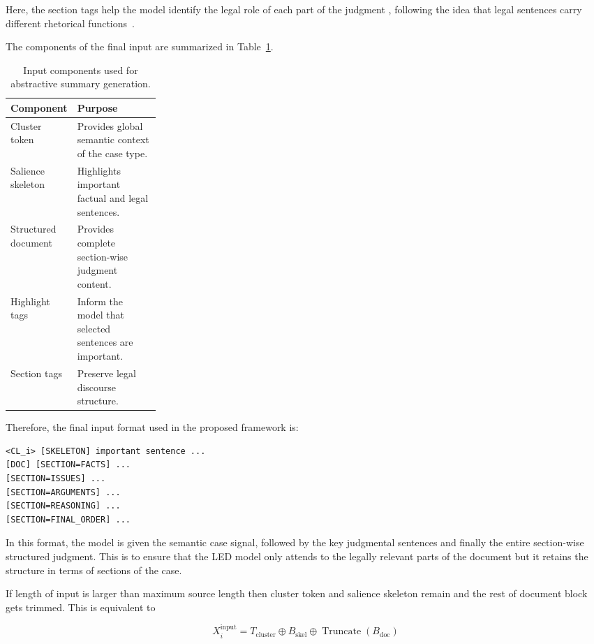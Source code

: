 \documentclass[11pt, a4paper]{article}
\theoremstyle{plain}%
\theoremstyle{remark}%
\theoremstyle{definition}%
\begin{document}
Here, the section tags help the model identify the legal role of each part of the judgment , following the idea that legal sentences carry different rhetorical functions~\cite{b3}.

The components of the final input are summarized in Table~\ref{tab:input_components}.

\begin{table}[H]
\centering
\caption{Input components used for abstractive summary generation.}
\label{tab:input_components}
\renewcommand{\arraystretch}{1.25}
\begin{tabularx}{\linewidth}{@{}p{0.25\linewidth}X@{}}
\toprule
\textbf{Component} & \textbf{Purpose} \\
\midrule
Cluster token & Provides global semantic context of the case type. \\
Salience skeleton & Highlights important factual and legal sentences. \\
Structured document & Provides complete section-wise judgment content. \\
Highlight tags & Inform the model that selected sentences are important. \\
Section tags & Preserve legal discourse structure. \\
\bottomrule
\end{tabularx}
\end{table}


Therefore, the final input format used in the proposed framework is:

\begin{verbatim}
<CL_i> [SKELETON] important sentence ...
[DOC] [SECTION=FACTS] ...
[SECTION=ISSUES] ...
[SECTION=ARGUMENTS] ...
[SECTION=REASONING] ...
[SECTION=FINAL_ORDER] ...
\end{verbatim}

In this format, the model is given the semantic case signal, followed by the key judgmental sentences and finally the entire section-wise structured judgment. This is to ensure that the LED model only attends to the legally relevant parts of the document but it retains the structure in terms of sections of the case.

If length of input is larger than maximum source length then cluster token and salience skeleton remain and the rest of document block gets trimmed. This is equivalent to

\begin{equation}
X_i^{\text{input}} =
T_{\text{cluster}} \oplus B_{\text{skel}} \oplus \operatorname{Truncate}(B_{\text{doc}})
\end{equation}
\end{document}

